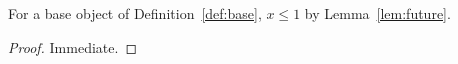 
\begin{theorem}\label{thm:early}
For a base object of Definition~\ref{def:base}, $x \le 1$ by
Lemma~\ref{lem:future}.
\end{theorem}

\begin{proof}
Immediate.
\end{proof}
